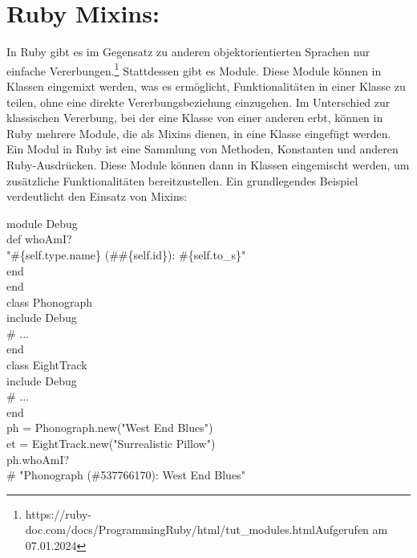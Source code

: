 \documentclass{article}
\begin{document}
\section*{Ruby Mixins:}
In Ruby gibt es im Gegensatz zu anderen objektorientierten Sprachen nur einfache Vererbungen.\footnote{https://ruby-doc.com/docs/ProgrammingRuby/html/tut\_modules.htmlAufgerufen am 07.01.2024} Stattdessen gibt es Module. Diese Module können in Klassen eingemixt werden, was es ermöglicht, Funktionalitäten in einer Klasse zu teilen, ohne eine direkte Vererbungsbeziehung einzugehen.
Im Unterschied zur klassischen Vererbung, bei der eine Klasse von einer anderen erbt, können in Ruby mehrere Module, die als Mixins dienen, in eine Klasse eingefügt werden. Ein Modul in Ruby ist eine Sammlung von Methoden, Konstanten und anderen Ruby-Ausdrücken. Diese Module können dann in Klassen eingemischt werden, um zusätzliche Funktionalitäten bereitzustellen.
Ein grundlegendes Beispiel verdeutlicht den Einsatz von Mixins:

module Debug \\ 
  def whoAmI? \\ 
    "\#\{self.type.name\} (\#\#\{self.id\}): \#\{self.to\_s\}" \\ 
  end \\ 
end \\ 

class Phonograph \\ 
include Debug \\ 
  \# ... \\ 
end \\ 

class EightTrack \\ 
  include Debug \\ 
  \# ... \\ 
end \\ 

ph = Phonograph.new("West End Blues") \\ 
et = EightTrack.new("Surrealistic Pillow") \\ 

ph.whoAmI? \\ 
\# "Phonograph (\#537766170): West End Blues" \\ 
\end{document}
